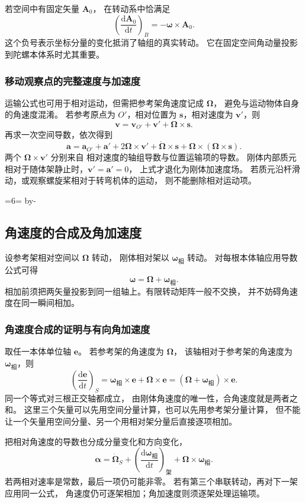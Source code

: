 \documentclass[UTF8,zihao=-4,fontset=fandol,a4paper]{ctexart}
\makeatletter
\newcommand{\vect}[1]{\bm{#1}}
\newcommand{\dd}{\mathrm d}
\newcommand{\Needspace}[1]{\par\if@nobreak\else\penalty0\begingroup\dimen0=#1\relax\dimen2=\pagegoal\advance\dimen2 by-\pagetotal\ifdim\dimen0>\dimen2\newpage\fi\endgroup\fi}
\let\SavedSubsection\subsection
\renewcommand{\subsection}{\Needspace{6\baselineskip}\SavedSubsection}
\makeatother
\begin{document}
若空间中有固定矢量 $\vect A_0$，
在转动系中恰满足
\[
\left(\frac{\dd\vect A_0}{\dd t}\right)_B
=-\vect\omega\times\vect A_0.
\]
这个负号表示坐标分量的变化抵消了轴组的真实转动。
它在固定空间角动量投影到陀螺本体系时尤其重要。

\subsubsection*{移动观察点的完整速度与加速度}
运输公式也可用于相对运动，但需把参考架角速度记成 $\vect\Omega$，
避免与运动物体自身的角速度混淆。
若参考原点为 $O'$，相对位置为 $\vect s$，相对速度为 $\vect v'$，则
\[
\vect v=\vect v_{O'}+\vect v'+\vect\Omega\times\vect s.
\]
再求一次空间导数，依次得到
\[
\vect a=\vect a_{O'}+\vect a'
+2\vect\Omega\times\vect v'
+\dot{\vect\Omega}\times\vect s
+\vect\Omega\times(\vect\Omega\times\vect s).
\]
两个 $\vect\Omega\times\vect v'$ 分别来自
相对速度的轴组导数与位置运输项的导数。
刚体内部质元相对于随体架静止时，$\vect v'=\vect a'=0$，
上式才退化为刚体加速度场。
若质元沿杆滑动，或观察螺旋桨相对于转弯机体的运动，
则不能删除相对运动项。


\subsection{角速度的合成及角加速度}\label{sub:c3-2.4}
设参考架相对空间以 $\vect\Omega$ 转动，
刚体相对架以 $\vect\omega_{\text{相}}$ 转动。
对每根本体轴应用导数公式可得
\begin{equation}
\vect\omega=\vect\Omega+\vect\omega_{\text{相}}.
\end{equation}
相加前须把两矢量投影到同一组轴上。有限转动矩阵一般不交换，
并不妨碍角速度在同一瞬间相加。


\subsubsection*{角速度合成的证明与有向角加速度}
取任一本体单位轴 $\vect e$。
若参考架的角速度为 $\vect\Omega$，
该轴相对于参考架的角速度为 $\vect\omega_{\text{相}}$，则
\[
\left(\frac{\dd\vect e}{\dd t}\right)_S
=\vect\omega_{\text{相}}\times\vect e+\vect\Omega\times\vect e
=(\vect\Omega+\vect\omega_{\text{相}})\times\vect e.
\]
同一个等式对三根正交轴都成立，
由刚体角速度的唯一性，合角速度就是两者之和。
这里三个矢量可以先用空间分量计算，也可以先用参考架分量计算，
但不能让一个矢量用空间分量、另一个用相对架分量后直接逐项相加。

把相对角速度的导数也分成分量变化和方向变化，
\[
\vect\alpha
=\dot{\vect\Omega}_S+
\left(\frac{\dd\vect\omega_{\text{相}}}{\dd t}\right)_{\text{架}}
+\vect\Omega\times\vect\omega_{\text{相}}.
\]
若两相对速率是常数，最后一项仍可能非零。
若有第三个串联转动，再对下一架应用同一公式，
角速度仍可逐架相加；角加速度则须逐架处理运输项。
\end{document}
